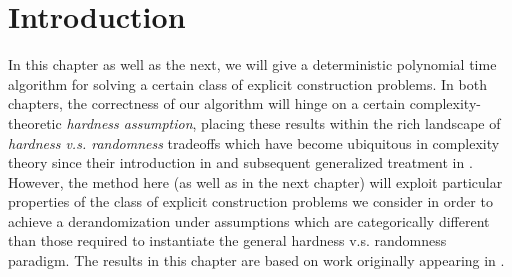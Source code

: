 %

\section{Introduction}\label{lossy:sec:intro}

In this chapter as well as the next, we will give a deterministic polynomial time algorithm for solving a certain class of explicit construction problems. In both chapters, the correctness of our algorithm will hinge on a certain complexity-theoretic \emph{hardness assumption}, placing these results within the rich landscape of \emph{hardness v.s. randomness} tradeoffs which have become ubiquitous in complexity theory since their introduction in \cite{Yao} and subsequent generalized treatment in \cite{NW, IW}. However, the method here (as well as in the next chapter) will exploit particular properties of the class of explicit construction problems we consider in order to achieve a derandomization under assumptions which are categorically different than those required to instantiate the general hardness v.s. randomness paradigm. The results in this chapter are based on work originally appearing in \cite{time-space}.

